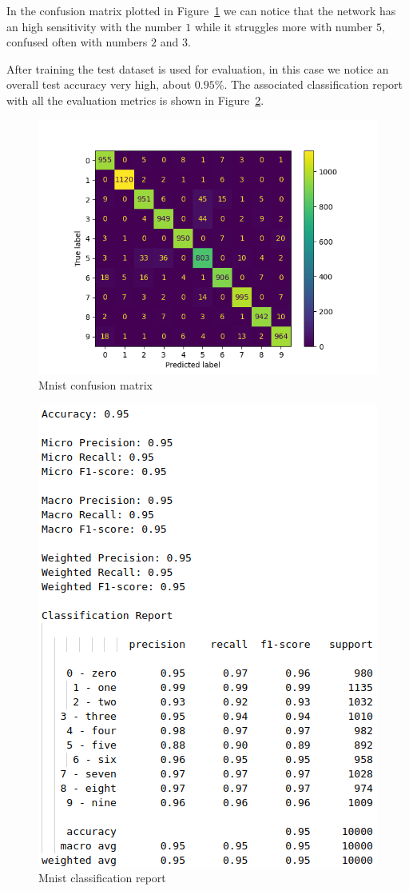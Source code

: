 \documentclass[12pt, letterpaper, twoside]{article}
\begin{document}
In the confusion matrix plotted in Figure~\ref{fig:mnist_cm} we can notice that the network has an high sensitivity with the number $1$ while it struggles more with number $5$, confused often with numbers $2$ and $3$.

After training the test dataset is used for evaluation, in this case we notice an overall test accuracy very high, about $0.95\%$. The associated classification report with all the evaluation metrics is shown in Figure~\ref{fig:mnist_class_report}.\\

\begin{figure}[H]
	\centering
	\includegraphics[width=.7\textwidth]{cm_mnist_small.png}
	\caption{Mnist confusion matrix}
	\label{fig:mnist_cm}
\end{figure}

\begin{figure}[ht]
	\centering
	\includegraphics[width=.6\textwidth]{report_mnist_small.png}
	\caption{Mnist classification report}
	\label{fig:mnist_class_report}
\end{figure}
\end{document}
